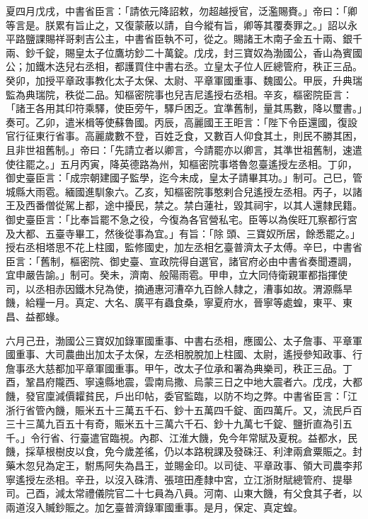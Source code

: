 \begin{pinyinscope}
 夏四月戊戌，中書省臣言：「請依元降詔敕，勿超越授官，泛濫賜賚。」帝曰：「卿等言是。朕累有旨止之，又復蒙蔽以請，自今縱有旨，卿等其覆奏罪之。」詔以永平路鹽課賜祥哥剌吉公主，中書省臣執不可，從之。賜諸王木南子金五十兩、銀千兩、鈔千錠，賜皇太子位鷹坊鈔二十萬錠。戊戌，封三寶奴為渤國公，香山為賓國公；加鐵木迭兒右丞相，都護買住中書右丞。立皇太子位人匠總管府，秩正三品。癸卯，加授平章政事教化太子太保、太尉、平章軍國重事、魏國公。甲辰，升典瑞監為典瑞院，秩從二品。知樞密院事也兒吉尼遙授右丞相。辛亥，樞密院臣言：「諸王各用其印符乘驛，使臣旁午，驛戶困乏。宜準舊制，量其馬數，降以璽書。」奏可。乙卯，遣米楫等使蘇魯國。丙辰，高麗國王王昛言：「陛下令臣還國，復設官行征東行省事。高麗歲數不登，百姓乏食，又數百人仰食其土，則民不勝其困，且非世祖舊制。」帝曰：「先請立者以卿言，今請罷亦以卿言，其準世祖舊制，速遣使往罷之。」五月丙寅，降英德路為州，知樞密院事塔魯忽臺遙授左丞相。丁卯，御史臺臣言：「成宗朝建國子監學，迄今未成，皇太子請畢其功。」制可。己巳，管城縣大雨雹。緬國進馴象六。乙亥，知樞密院事憨剌合兒遙授左丞相。丙子，以諸王及西番僧從駕上都，途中擾民，禁之。禁白蓮社，毀其祠宇，以其人還隸民籍。御史臺臣言：「比奉旨罷不急之役，今復為各官營私宅。臣等以為俟旺兀察都行宮及大都、五臺寺畢工，然後從事為宜。」有旨：「除頭、三寶奴所居，餘悉罷之。」授右丞相塔思不花上柱國，監修國史，加左丞相乞臺普濟太子太傅。辛巳，中書省臣言：「舊制，樞密院、御史臺、宣政院得自選官，諸官府必由中書省奏聞遷調，宜申嚴告諭。」制可。癸未，濟南、般陽雨雹。甲申，立大同侍衛親軍都指揮使司，以丞相赤因鐵木兒為使，摘通惠河漕卒九百餘人隸之，漕事如故。渭源縣旱饑，給糧一月。真定、大名、廣平有蟲食桑，寧夏府水，晉寧等處蝗，東平、東昌、益都蝝。



 六月己丑，渤國公三寶奴加錄軍國重事、中書右丞相，應國公、太子詹事、平章軍國重事、大司農曲出加太子太保，左丞相脫脫加上柱國、太尉，遙授參知政事、行詹事丞大慈都加平章軍國重事。甲午，改太子位承和署為典樂司，秩正三品。丁酉，鞏昌府隴西、寧遠縣地震，雲南烏撒、烏蒙三日之中地大震者六。戊戌，大都饑，發官廩減價糶貧民，戶出印帖，委官監臨，以防不均之弊。中書省臣言：「江浙行省管內饑，賑米五十三萬五千石、鈔十五萬四千錠、面四萬斤。又，流民戶百三十三萬九百五十有奇，賑米五十三萬六千石、鈔十九萬七千錠、鹽折直為引五千。」令行省、行臺遣官臨視。內郡、江淮大饑，免今年常賦及夏稅。益都水，民饑，採草根樹皮以食，免今歲差徭，仍以本路稅課及發硃汪、利津兩倉粟賑之。封藥木忽兒為定王，駙馬阿失為昌王，並賜金印。以司徒、平章政事、領大司農李邦寧遙授左丞相。辛丑，以沒入硃清、張瑄田產隸中宮，立江浙財賦總管府、提舉司。己酉，減太常禮儀院官二十七員為八員。河南、山東大饑，有父食其子者，以兩道沒入贓鈔賑之。加乞臺普濟錄軍國重事。是月，保定、真定蝗。




\end{pinyinscope}
